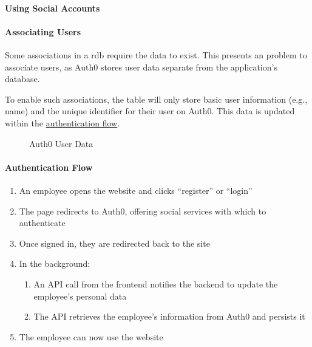 \paragraph{Using Social Accounts}

\paragraph{Associating Users}
Some associations in a \gls{rdb} require the data to exist.
This presents an problem to associate users, as Auth0
stores user data separate from the application's database.

To enable such associations, the  table will
only store basic user information (e.g., name) and the
unique identifier for their user on Auth0.
This data is updated within the
\hyperref[p:authFlow]{authentication flow}.

\begin{figure}
  
  \caption{Auth0 User Data}
  \label{fig:auth0Data}
\end{figure}

\paragraph{Authentication Flow}
\label{p:authFlow}

\begin{enumerate}

  \item An employee opens the \projectname{} website and
        clicks \enquote{register} or \enquote{login}

  \item The page redirects to Auth0, offering social
        services with which to authenticate

  \item Once signed in, they are redirected back to the
        \projectname{} site

  \item In the background:
        \begin{enumerate}
          \item An API call from the frontend notifies the
                backend to update the employee's
                personal data

          \item The API retrieves the employee's
                information from Auth0 and persists it
        \end{enumerate}

  \item The employee can now use the website
\end{enumerate}


